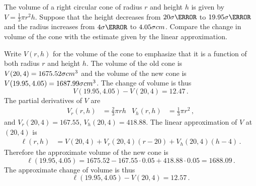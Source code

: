 \begin{question}
The volume of a right circular cone of radius $r$ and height $h$ is given by $V=\frac 13 \pi r^2 h$. Suppose that the height decreases from $20\six{\cm}$ to $19.95\six{\cm}$ and the radius increases from $4\six{\cm}$ to $4.05\six{cm}$. Compare the change in volume of the cone with the estimate given by the linear approximation.
\end{question}

\begin{solution}
Write $V(r,h)$ for the volume of the cone to emphasize that it is a function of both radius $r$ and height $h$. The volume of the old cone is $V(20, 4) = 1675.52\six{cm^3}$ and the volume of the new cone is $V(19.95, 4.05) = 1687.99\six{cm^3}$. The change of volume is thus
\[
V(19.95, 4.05) - V(20,4) = 12.47\,.
\]
The partial derivatives of $V$ are
\begin{align*}
V_r(r,h) &= \frac 23 \pi r h &
V_h(r,h) &= \frac 13 \pi r^2\,,
\end{align*}
and $V_r(20,4) = 167.55$, $V_h(20,4) = 418.88$. The linear approximation of $V$ at $(20,4)$ is
\begin{align*}
\ell(r,h) &= V(20,4) + V_r(20,4)(r-20) + V_h(20,4)(h-4)\,.
\end{align*}
Therefore the approximate volume of the new cone is
\[
\ell(19.95, 4.05) = 1675.52 - 167.55 \cdot 0.05 + 418.88 \cdot 0.05 = 1688.09\,.
\]
The approximate change of volume is thus
\[
\ell(19.95, 4.05) - V(20,4) = 12.57\,.
\]
\end{solution}



